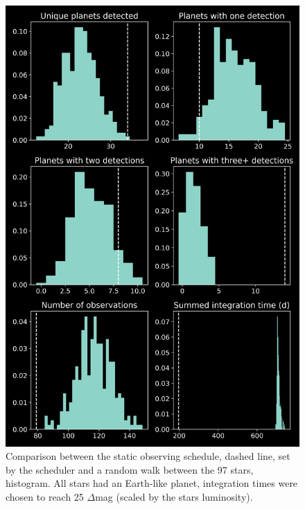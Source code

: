 \begin{figure}
  \begin{center}
    \includegraphics[height=0.75\textheight]{ch4/figures/hist.png}
  \end{center}
  \caption{Comparison between the static observing schedule, dashed line, set by the
  scheduler and a random walk between the 97 stars, histogram. All stars had an Earth-like planet,
  integration times were chosen to reach 25 $\Delta$mag (scaled by the stars luminosity).}
  \label{fig:randomwalkhist}
\end{figure}

